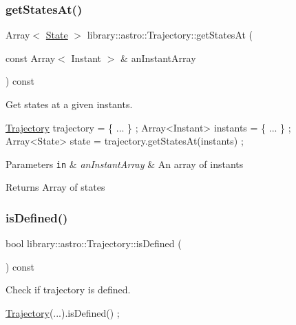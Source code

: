\subsubsection{\texorpdfstring{get\+States\+At()}{getStatesAt()}}
{\footnotesize\ttfamily Array$<$ \hyperlink{classlibrary_1_1astro_1_1trajectory_1_1_state}{State} $>$ library\+::astro\+::\+Trajectory\+::get\+States\+At (\begin{DoxyParamCaption}\item[{const Array$<$ Instant $>$ \&}]{an\+Instant\+Array }\end{DoxyParamCaption}) const}



Get states at a given instants. 


\begin{DoxyCode}
\hyperlink{classlibrary_1_1astro_1_1_trajectory_a8e5c7740915ca947e067c0f419ac1c65}{Trajectory} trajectory = \{ ... \} ;
Array<Instant> instants = \{ ... \} ;
Array<State> state = trajectory.getStatesAt(instants) ;
\end{DoxyCode}



\begin{DoxyParams}[1]{Parameters}
\mbox{\tt in}  & {\em an\+Instant\+Array} & An array of instants \\
\hline
\end{DoxyParams}
\begin{DoxyReturn}{Returns}
Array of states 
\end{DoxyReturn}
\mbox{\label{classlibrary_1_1astro_1_1_trajectory_aab36edc2566e11d4b5de340cd8230dee}} 
\subsubsection{\texorpdfstring{is\+Defined()}{isDefined()}}
{\footnotesize\ttfamily bool library\+::astro\+::\+Trajectory\+::is\+Defined (\begin{DoxyParamCaption}{ }\end{DoxyParamCaption}) const}



Check if trajectory is defined. 


\begin{DoxyCode}
\hyperlink{classlibrary_1_1astro_1_1_trajectory_a8e5c7740915ca947e067c0f419ac1c65}{Trajectory}(...).isDefined() ;
\end{DoxyCode}


